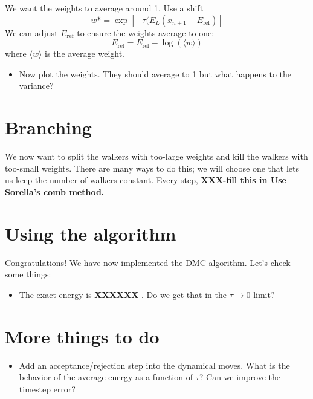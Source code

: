 \documentclass[12pt]{article}
\begin{document}
We want the weights to average around 1.
Use a shift 
\begin{equation}
w*=	\exp[-\tau (E_L(x_{n+1}-E_{\text{ref}})] 
\end{equation}
We can adjust $E_{\text {ref}}$ to ensure the weights average to one:
\begin{equation}
E_{\text{ref}}=E_{\text{ref}}-\log(\langle w \rangle) 
\end{equation}
where $\langle w \rangle$ is the average weight. 

\begin{itemize}
\item Now plot the weights. They should average to 1 but what happens to the variance?
\end{itemize}

\section{Branching} 

We now want to split the walkers with too-large weights and kill the walkers with too-small weights. 
There are many ways to do this; we will choose one that lets us keep the number of walkers constant. 
Every step, 
{\bf XXX-fill this in Use Sorella's comb method. } 

\section{Using the algorithm}
Congratulations! We have now implemented the DMC algorithm. 
Let's check some things:

\begin{itemize}
\item The exact energy is {\bf XXXXXX }. Do we get that in the $\tau\rightarrow0$ limit?
\end{itemize}

\section{More things to do}
\begin{itemize}
\item Add an acceptance/rejection step into the dynamical moves. What is the behavior of the average energy as a function of $\tau$? Can we improve the timestep error?	
\end{itemize}
\end{document}
